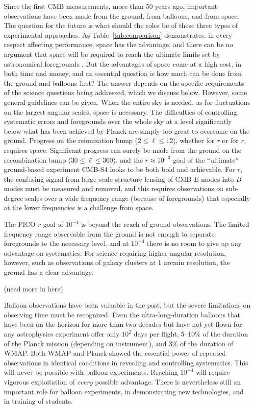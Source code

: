 \documentclass[PICOReport.tex]{subfiles}
\begin{document}
Since the first \ac{CMB} measurements, more than 50 years ago, important observations have been made from the ground, from balloons, and from space.  The question for the future is what should the roles be of these three types of experimental approaches.  As Table~\ref{tab:comparison} demonstrates, in every respect affecting performance, space has the advantage, and there can be no argument that space will be required to reach the ultimate limits set by astronomical foregrounds .  But the advantages of space come at a high cost, in both time and money, and an essential question is how much can be done from the ground and balloons first?  The answer depends on the specific requirements of the science questions being addressed, which we discuss below. However, some general guidelines can be given.  When the entire sky is needed, as for fluctuations on the largest angular scales, space is necessary.  The difficulties of controlling systematic errors and foregrounds over the whole sky at a level significantly below what has been achieved by Planck are simply too great to overcome on the ground.  Progress on the reionization bump ($2\leq \ell \leq 12$), whether for $\tau$ or for $r$, requires space.  Significant progress can surely be made from the ground on the recombination bump ($30 \leq \ell \leq 300$), and the $r \approx 10^{-3}$ goal of the ``ultimate'' ground-based experiment CMB-S4 looks to be both bold and achievable.  For $r$, the confusing signal from large-scale-structure lensing of CMB $E$-modes into $B$-modes must be measured and removed, and this requires observations on sub-degree scales over a wide frequency range (because of foregrounds) that especially at the lower frequencies is a challenge from space.

The PICO $r$ goal of $10^{-4}$ is beyond the reach of ground observations.  The limited frequency range observable from the ground is not enough to separate foregrounds to the necessary level, and at $10^{-4}$ there is no room to give up any advantage on systematics.  For science requiring higher angular resolution, however, such as observations of galaxy clusters at 1 arcmin resolution, the ground has a clear advantage.

(need more in here)

Balloon observations have been valuable in the past, but the severe limitations on observing time must be recognized.  Even the ultra-long-duration balloons that have been on the horizon for more than two decades but have not yet flown for any astrophysics experiment offer only $10^2$ days per flight, 5--10\% of the duration of the Planck mission (depending on instrument), and 3\% of the duration of WMAP.  Both WMAP and Planck showed the essential power of repeated observations in identical conditions in revealing and controlling systematics.  This will never be possible with balloon experiments.  Reaching $10^{-4}$ will require vigorous exploitation of {\it every\/} possible advantage.  There is nevertheless still an important role for balloon experiments, in demonstrating new technologies, and in training of students.
\end{document}
